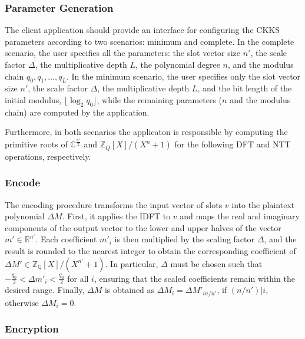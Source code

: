 \subsubsection{Parameter Generation}

The client application should provide an interface for configuring the CKKS parameters according to two scenarios: minimum and complete. In the complete scenario, the user specifies all the parameters: the slot vector size $n'$, the scale factor $\Delta$, the multiplicative depth $L$, the polynomial degree $n$, and the modulus chain $q_0, q_1, \ldots, q_L$. In the minimum scenario, the user specifies only the slot vector size $n'$, the scale factor $\Delta$, the multiplicative depth $L$, and the bit length of the initial modulus, $\lfloor \log_2 q_0 \rfloor$, while the remaining parameters ($n$ and the modulus chain) are computed by the application.

Furthermore, in both scenarios the applicaton is responsible by computing the primitive roots of $\mathbb{C}^{\frac{n'}{2}}$ and $\mathbb{Z}_Q[X]/(X^n+1)$ for the following DFT and NTT operations, respectively.

\subsubsection{Encode}

The encoding procedure transforms the input vector of slots $v$ into the plaintext polynomial $\Delta M$. First, it applies the IDFT to $v$ and maps the real and imaginary components of the output vector to the lower and upper halves of the vector $m' \in \mathbb{R}^{n'}$. Each coefficient $m'_i$ is then multiplied by the scaling factor $\Delta$, and the result is rounded to the nearest integer to obtain the corresponding coefficient of $\Delta M' \in \mathbb{Z_Q}[X]/(X^{n'}+1)$. In particular, $\Delta$ must be chosen such that $-\frac{q_0}{2} < \Delta m'_i < \frac{q_0}{2}$ for all $i$, ensuring that the scaled coefficients remain within the desired range. Finally, $\Delta M$ is obtained as $\Delta M_i = \Delta M'_{in/n'}$, if $(n/n')|i$, otherwise $\Delta M_i = 0$.

\subsubsection{Encryption}
\label{ckks:encrypt}


